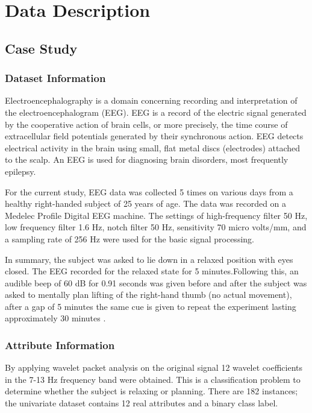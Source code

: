 \documentclass{cmppgr}
\begin{document}
 


\section{Data Description}


\subsection{Case Study}
\subsubsection{Dataset Information}
Electroencephalography is a domain concerning recording and interpretation of the electroencephalogram (EEG). EEG is a record of the electric signal generated by the cooperative action of brain cells, or more precisely, the time course of extracellular field potentials generated by their synchronous action\cite{lindsley1950emotions}. EEG detects electrical activity in the brain using small, flat metal discs (electrodes) attached to the scalp. An EEG is used for diagnosing brain disorders, most frequently epilepsy. 



For the current study, EEG data was collected 5 times on various days from a healthy right-handed subject of 25 years of age. The data was recorded on a Medelec Profile Digital EEG machine. The settings of high-frequency filter 50 Hz, low frequency filter 1.6 Hz, notch filter 50 Hz, sensitivity 70 micro volts/mm, and a sampling rate of 256 Hz were used for the basic signal processing. 

In summary, the subject was asked to lie down in a relaxed position with eyes closed. The EEG recorded for the relaxed state for 5 minutes.Following this, an audible beep of 60 dB for 0.91 seconds was given before and after the subject was asked to mentally plan lifting of the right-hand thumb (no actual movement), after a gap of 5 minutes the same cue is given to repeat the experiment lasting approximately 30 minutes \cite{planning_relax_data_set}.

\subsubsection{Attribute Information}
By applying wavelet packet analysis on the original signal 12 wavelet coefficients in the 7-13 Hz frequency band were obtained. This is a classification problem to determine whether the subject is relaxing or planning. There are 182 instances; the univariate dataset contains 12 real attributes and a binary class label.
 
\end{document}
